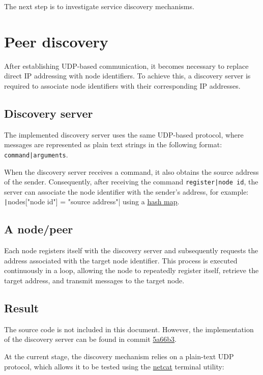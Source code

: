 \documentclass[a4paper, 10pt]{article}
\let\oldsection\section
\renewcommand{\section}{
  \clearpage
  \oldsection
}
\begin{document}
The next step is to investigate service discovery mechanisms.

\section{Peer discovery}

After establishing UDP-based communication, it becomes necessary to replace direct IP addressing with node identifiers.
To achieve this, a discovery server is required to associate node identifiers with their corresponding IP addresses.

\subsection{Discovery server}

The implemented discovery server uses the same UDP-based protocol,
where messages are represented as plain text strings in the following format:
\texttt{command|arguments}.

When the discovery server receives a command, it also obtains the source address of the sender.
Consequently, after receiving the command \texttt{register|node id}, the server can associate the node identifier with the sender's address, for example:
\texttt|nodes["node id"] = "source address"|
using a \href{https://en.wikipedia.org/wiki/Hash_table}{hash map}.

\subsection{A node/peer}

Each node registers itself with the discovery server and subsequently requests
the address associated with the target node identifier.
This process is executed continuously in a loop, allowing the node to repeatedly
register itself, retrieve the target address, and transmit messages to the target node.

\subsection{Result}

The source code is not included in this document.
However, the implementation of the discovery server can be found in commit
\href{https://github.com/dankmolot/petope/tree/5a66b32a015f395bc614a1aedc54a87a44d8dbc1}{5a66b3}.

At the current stage, the discovery mechanism relies on a plain-text UDP protocol,
which allows it to be tested using the \href{https://en.wikipedia.org/wiki/Netcat}{netcat} terminal utility:
\end{document}
